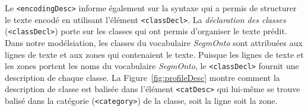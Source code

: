 \documentclass[class=article, crop=false]{standalone}
\begin{document}
Le \texttt{<encodingDesc>} informe également sur la syntaxe qui a permis de structurer le texte encodé en utilisant l'élément \texttt{<classDecl>}. La \textit{déclaration des classes} (\texttt{<classDecl>}) porte sur les classes qui ont permis d'organiser le texte prédit. Dans notre modélsiation, les classes du vocabulaire \textit{SegmOnto} sont attribuées aux lignes de texte et aux zones qui contenaient le texte. Puisque les lignes de texte et les zones portent les noms du vocabulaire \textit{SegmOnto}, le \texttt{<classDecl>} fournit une description de chaque classe. La Figure~\ref{fig:profileDesc} montre comment la description de classe est balisée dans l'élément \texttt{<catDesc>} qui lui-même se trouve balisé dans la catégorie (\texttt{<category>}) de la classe, soit la ligne soit la zone.
\end{document}

